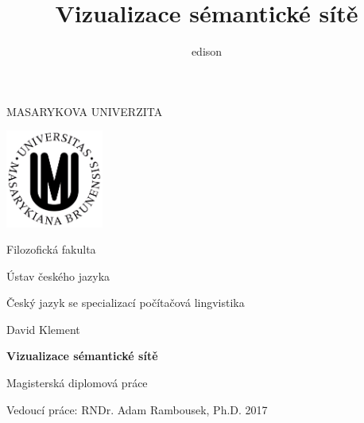 \documentclass[a4paper,11pt,openany,twoside]{book}
\author{edison}
\title{Vizualizace sémantické sítě}
\begin{document}


	
	
	\begin{titlepage}
		\begin{center}
			{\Large\uppercase{Masarykova univerzita}}

			\vspace{1em}

			\includegraphics[width=0.24\textwidth]{logo-muni.png}
			
			\vspace{2em}

			{\Large Filozofická fakulta}

			\vspace{1em}

			{\large Ústav českého jazyka}

			\vspace{1em}

			{\large Český jazyk se specializací počítačová lingvistika}

			\vspace{7em}

			{\Large David Klement}
			
			\vspace{5em}
			
			{\huge\bf Vizualizace sémantické sítě}

			\vspace{1.5em}

			{\Large Magisterská diplomová práce}

			\vfill
		\end{center}
		\begin{flushleft}
			Vedoucí práce: RNDr. Adam Rambousek, Ph.D. \hfill 2017
		\end{flushleft}
	\end{titlepage}
\end{document}
